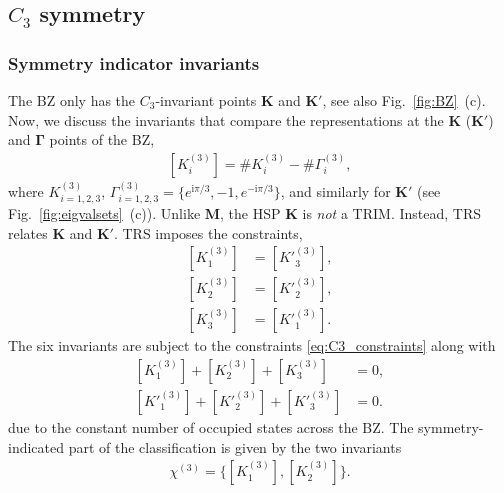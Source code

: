 \subsection{$C_3$ symmetry}
\subsubsection*{Symmetry indicator invariants} 
The BZ only has the $C_3$-invariant points $\mathbf{K}$ and $\mathbf{K'}$, see also Fig.~\ref{fig:BZ}~(c). Now, we discuss the invariants that compare the representations at the $\mathbf{K}$ ($\mathbf{K'}$) and $\mathbf{\Gamma}$ points of the BZ,
\begin{equation} 
\begin{aligned}
[K^{(3)}_i]= \#K^{(3)}_i - \#\Gamma^{(3)}_i,
\end{aligned} 
\label{eq:C3spinfulindicators}
\end{equation}
where $K^{(3)}_{i=1,2,3}$, $\Gamma^{(3)}_{i=1,2,3}=\{e^{\mathrm{i} \pi/3},-1,e^{-\mathrm{i} \pi/3}\}$, and similarly for $\mathbf{K'}$ (see Fig.~\ref{fig:eigvalsets}~(c)). Unlike $\mathbf{M}$, the HSP $\mathbf{K}$ is \emph{not} a TRIM. Instead, TRS relates $\mathbf{K}$ and $\mathbf{K'}$. TRS imposes the constraints,
\begin{equation} 
\begin{aligned}
[K^{(3)}_1] &= [K'^{(3)}_3], \\
[K^{(3)}_2] &= [K'^{(3)}_2], \\
[K^{(3)}_3] &= [K'^{(3)}_1].
\end{aligned} 
\label{eq:C3_constraints}
\end{equation}
The six invariants are subject to the constraints \eqref{eq:C3_constraints} along with
\begin{equation} 
\begin{aligned}
[K^{(3)}_1]+[K^{(3)}_2]+[K^{(3)}_3] &=0, \\
[K'^{(3)}_1]+[K'^{(3)}_2]+[K'^{(3)}_3] &=0.
\end{aligned} 
\label{eq:secondsetofC3indicatorconstraints}
\end{equation}
due to the constant number of occupied states across the BZ. The symmetry-indicated part of the classification is given by the two invariants
\begin{equation}
 \begin{aligned}
\chi^{(3)}=\{[K^{(3)}_1],[K^{(3)}_2]\}.
\end{aligned} 
\end{equation}

